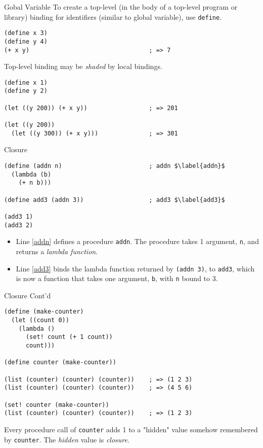 \documentclass[presentation]{beamer}
\begin{document}
\begin{frame}[fragile,label={sec:orgheadline43}]{Gobal Variable}
 To create a top-level (in the body of a top-level program or
library) binding for identifiers (similar to global variable), use
\texttt{define}.

\begin{verbatim}
(define x 3)
(define y 4)
(+ x y)                                 ; => 7
\end{verbatim}

Top-level binding may be \emph{shaded} by local bindings.

\begin{verbatim}
(define x 1)
(define y 2)

(let ((y 200)) (+ x y))                 ; => 201

(let ((y 200))
  (let ((y 300)) (+ x y)))              ; => 301
\end{verbatim}
\end{frame}

\begin{frame}[fragile,label={sec:orgheadline44}]{Closure}
 \begin{verbatim}
(define (addn n)                        ; addn $\label{addn}$
  (lambda (b)
    (+ n b)))

(define add3 (addn 3))                  ; add3 $\label{add3}$

(add3 1)
(add3 2)
\end{verbatim}

\begin{itemize}
\item Line \ref{addn} defines a procedure \texttt{addn}.  The procedure takes
1 argument, \texttt{n}, and returns a \emph{lambda function}.

\item Line \ref{add3} binds the lambda function returned by \texttt{(addn 3)},
to \texttt{add3}, which is now a function that takes one argument, \texttt{b},
with \texttt{n} bound to 3.
\end{itemize}
\end{frame}

\begin{frame}[fragile,label={sec:orgheadline45}]{Closure Cont'd}
 \begin{verbatim}
(define (make-counter)
  (let ((count 0))
    (lambda ()
      (set! count (+ 1 count))
      count)))

(define counter (make-counter))

(list (counter) (counter) (counter))    ; => (1 2 3)
(list (counter) (counter) (counter))    ; => (4 5 6)

(set! counter (make-counter))
(list (counter) (counter) (counter))    ; => (1 2 3)
\end{verbatim}

Every procedure call of \texttt{counter} adds 1 to a "hidden" value
somehow remembered by \texttt{counter}.  The \emph{hidden} value is \emph{closure}.
\end{frame}
\end{document}
